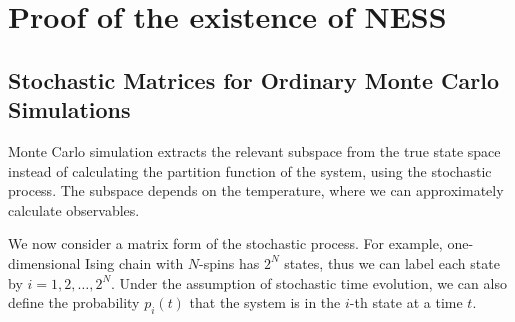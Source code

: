 
\chapter{Proof of the existence of NESS}

\section{Stochastic Matrices for Ordinary Monte Carlo Simulations}

Monte Carlo simulation extracts the relevant subspace from the true state space instead of calculating the partition function of the system, using the stochastic process. The subspace depends on the temperature, where we can approximately calculate observables.

We now consider a matrix form of the stochastic process. For example, one-dimensional Ising chain with $N$-spins has $2^{N}$ states, thus we can label each state by $i=1,2,\dots,2^{N}$. Under the assumption of stochastic time evolution, we can also define the probability $p_{i}(t)$ that the system is in the $i$-th state at a time $t$.

